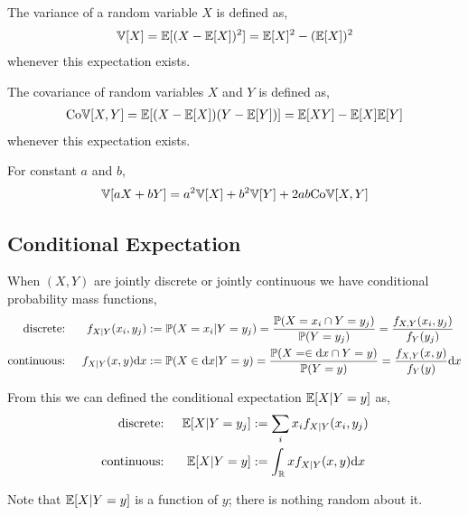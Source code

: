 \documentclass[12pt]{article}
\begin{document}
\begin{definition}[Variance]
The variance of a random variable \( X \) is defined as,
\begin{align*}
    \mathbb{V}[ X ] = \mathbb{E}[(X-\mathbb{E}[ X ])^2] = \mathbb{E}[ X ]^2 - (\mathbb{E}[ X ])^2
\end{align*}
whenever this expectation exists.
\end{definition}

\begin{definition}[Covariance]
The covariance of random variables \( X \) and \( Y \) is defined as,
\begin{align*}
    \text{Co}\mathbb{V}[ X , Y ] = \mathbb{E}[(X-\mathbb{E}[ X ])(Y-\mathbb{E}[Y])] = \mathbb{E}[ XY ] - \mathbb{E}[ X ] \mathbb{E}[ Y]
\end{align*}
whenever this expectation exists.
\end{definition}

\begin{lemma}
For constant \( a \) and \( b \),
\begin{align*}
    \mathbb{V}[aX + bY] = a^2 \mathbb{V} [X] + b^2 \mathbb{V} [Y] + 2ab\text{Co}\mathbb{V}[X,Y]
\end{align*}
\end{lemma}


\subsection{Conditional Expectation}

When \( (X,Y) \) are jointly discrete or jointly continuous we have conditional probability mass functions,
\begin{align*}
    \text{discrete: } && f_{X|Y}(x_i,y_j)&:= \mathbb{P}(X=x_i | Y = y_j) = \dfrac{\mathbb{P}(X=x_i \cap Y = y_j)}{\mathbb{P}(Y = y_j)} = \dfrac{f_{X,Y}(x_i,y_j)}{f_Y(y_j)} \\
    \text{continuous: } && f_{X|Y}(x,y) \mathrm{d} x&:= \mathbb{P}(X \in \mathrm{d} x | Y = y) = \dfrac{\mathbb{P}(X=\in \mathrm{d} x \cap Y = y)}{\mathbb{P}(Y = y)} = \dfrac{f_{X,Y}(x,y)}{f_Y(y)}\mathrm{d} x
\end{align*}

From this we can defined the conditional expectation \( \mathbb{E}[X | Y = y] \) as,
\begin{align*}
    \text{discrete: } && \mathbb{E}[X|Y=y_j] &:= \sum_{i} x_i f_{X|Y}(x_i,y_j) \\
    \text{continuous: } && \mathbb{E}[X|Y=y] &:= \int_{\mathbb{R}} x f_{X|Y}(x,y)\mathrm{d} x
\end{align*}

Note that \( \mathbb{E}[X|Y=y] \) is a function of \( y \); there is nothing random about it.
\end{document}
